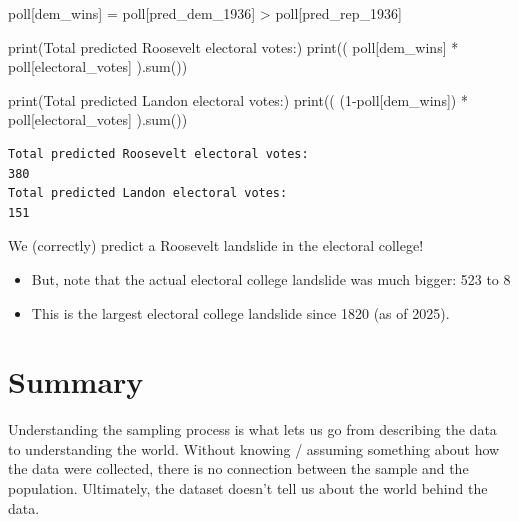 \documentclass[
  letterpaper,
  DIV=11,
  numbers=noendperiod]{scrreprt}
\newenvironment{Shaded}{\begin{snugshade}}{\end{snugshade}}
\newcommand{\BuiltInTok}[1]{\textcolor[rgb]{0.00,0.23,0.31}{#1}}
\newcommand{\DecValTok}[1]{\textcolor[rgb]{0.68,0.00,0.00}{#1}}
\newcommand{\NormalTok}[1]{\textcolor[rgb]{0.00,0.23,0.31}{#1}}
\newcommand{\OperatorTok}[1]{\textcolor[rgb]{0.37,0.37,0.37}{#1}}
\newcommand{\StringTok}[1]{\textcolor[rgb]{0.13,0.47,0.30}{#1}}
\begin{document}
\begin{Shaded}
\begin{Highlighting}[]
\NormalTok{poll[}\StringTok{\textquotesingle{}dem\_wins\textquotesingle{}}\NormalTok{] }\OperatorTok{=}\NormalTok{ poll[}\StringTok{\textquotesingle{}pred\_dem\_1936\textquotesingle{}}\NormalTok{] }\OperatorTok{\textgreater{}}\NormalTok{ poll[}\StringTok{\textquotesingle{}pred\_rep\_1936\textquotesingle{}}\NormalTok{]}

\BuiltInTok{print}\NormalTok{(}\StringTok{\textquotesingle{}Total predicted Roosevelt electoral votes:\textquotesingle{}}\NormalTok{)}
\BuiltInTok{print}\NormalTok{(( poll[}\StringTok{\textquotesingle{}dem\_wins\textquotesingle{}}\NormalTok{] }\OperatorTok{*}\NormalTok{ poll[}\StringTok{\textquotesingle{}electoral\_votes\textquotesingle{}}\NormalTok{] ).}\BuiltInTok{sum}\NormalTok{())}

\BuiltInTok{print}\NormalTok{(}\StringTok{\textquotesingle{}Total predicted Landon electoral votes:\textquotesingle{}}\NormalTok{)}
\BuiltInTok{print}\NormalTok{(( (}\DecValTok{1}\OperatorTok{{-}}\NormalTok{poll[}\StringTok{\textquotesingle{}dem\_wins\textquotesingle{}}\NormalTok{]) }\OperatorTok{*}\NormalTok{ poll[}\StringTok{\textquotesingle{}electoral\_votes\textquotesingle{}}\NormalTok{] ).}\BuiltInTok{sum}\NormalTok{())}
\end{Highlighting}
\end{Shaded}

\begin{verbatim}
Total predicted Roosevelt electoral votes:
380
Total predicted Landon electoral votes:
151
\end{verbatim}

We (correctly) predict a Roosevelt landslide in the electoral college!

\begin{itemize}
\item
  But, note that the actual electoral college landslide was much bigger:
  523 to 8
\item
  This is the largest electoral college landslide since 1820 (as of
  2025).
\end{itemize}

\section{Summary}\label{summary-1}

Understanding the sampling process is what lets us go from describing
the data to understanding the world. Without knowing / assuming
something about how the data were collected, there is no connection
between the sample and the population. Ultimately, the dataset doesn't
tell us about the world behind the data.
\end{document}
